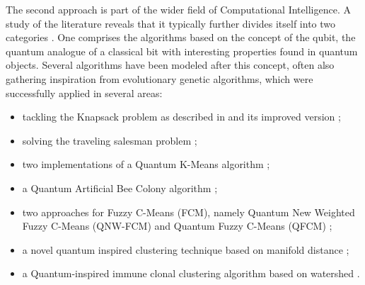 The second approach is part of the wider field of Computational Intelligence.
A study of the literature reveals that it typically further divides itself into two categories \cite{Casper2013}.%
One comprises the algorithms based on the concept of the qubit, the quantum analogue of a classical bit with interesting properties found in quantum objects.
Several algorithms have been modeled after this concept, often also gathering inspiration from evolutionary genetic algorithms, which were successfully applied in several areas:
\begin{itemize}
	\item tackling the Knapsack problem as described in \citet{Han2000} and its improved version \cite{Liu2010};

	\item solving the traveling salesman problem \cite{Talbi2004};

    \item two implementations of a Quantum K-Means algorithm \cite{Casper2012KMeans,Xiao2010};

    \item a Quantum Artificial Bee Colony algorithm \cite{hung2013quantum,Casper2013};

    \item two approaches for Fuzzy C-Means (FCM), namely Quantum New Weighted Fuzzy C-Means (QNW-FCM) \cite{Casper2013} and Quantum Fuzzy C-Means (QFCM) \cite{hung2013quantumcmeans,Casper2013};

    \item a novel quantum inspired clustering technique based on manifold distance \cite{Liang2009};

    \item a Quantum-inspired immune clonal clustering algorithm based on watershed \cite{Li2010}.
\end{itemize}

